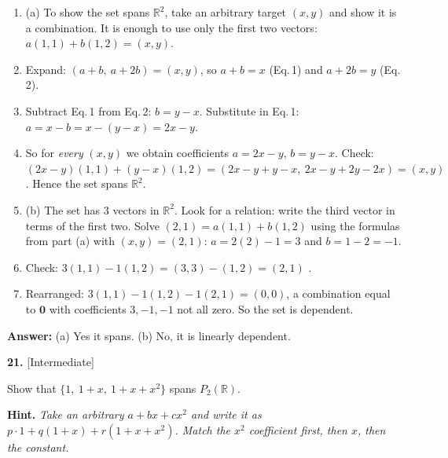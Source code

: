 \documentclass[11pt]{article}
\begin{document}
\begin{tcolorbox}[breakable,colback=ans,colframe=ansb,boxrule=0.5pt,left=4pt,right=4pt,top=2pt,bottom=2pt]\begin{enumerate}[leftmargin=2.2em,itemsep=1pt,topsep=1pt,label=\textbf{Step \arabic*.}]\item (a) To show the set spans $\mathbb{R}^{2}$, take an arbitrary target $(x,y)$ and show it is a combination. It is enough to use only the first two vectors: $a(1,1)+b(1,2)=(x,y)$.
\item Expand: $(a+b,\ a+2b)=(x,y)$, so $a+b=x$ \quad (Eq.\,1) and \quad $a+2b=y$ \quad (Eq.\,2).
\item Subtract Eq.\,1 from Eq.\,2: $b=y-x$. Substitute in Eq.\,1: $a=x-b=x-(y-x)=2x-y$.
\item So for \emph{every} $(x,y)$ we obtain coefficients $a=2x-y$, $b=y-x$. Check: $(2x-y)(1,1)+(y-x)(1,2)=(2x-y+y-x,\ 2x-y+2y-2x)=(x,y)$ \checkmark. Hence the set spans $\mathbb{R}^{2}$.
\item (b) The set has $3$ vectors in $\mathbb{R}^{2}$. Look for a relation: write the third vector in terms of the first two. Solve $(2,1)=a(1,1)+b(1,2)$ using the formulas from part (a) with $(x,y)=(2,1)$: $a=2(2)-1=3$ and $b=1-2=-1$.
\item Check: $3(1,1)-1(1,2)=(3,3)-(1,2)=(2,1)$ \checkmark.
\item Rearranged: $3(1,1)-1(1,2)-1(2,1)=(0,0)$, a combination equal to $\mathbf 0$ with coefficients $3,-1,-1$ not all zero. So the set is dependent.
\end{enumerate}\textbf{Answer:} (a) Yes it spans. (b) No, it is linearly dependent.\end{tcolorbox}
\par\vspace{2pt}
\begin{minipage}{\linewidth}\textbf{21.} \hfill{\scriptsize\color{ink}[Intermediate]}\par\nopagebreak Show that $\{1,\ 1+x,\ 1+x+x^{2}\}$ spans $P_{2}(\mathbb{R})$.
\par\smallskip\begingroup\small\color{ink}\textbf{Hint.} \textit{Take an arbitrary $a+bx+cx^2$ and write it as $p\cdot1+q(1+x)+r(1+x+x^2)$. Match the $x^2$ coefficient first, then $x$, then the constant.}\endgroup
\end{minipage}\par\nopagebreak
\end{document}
